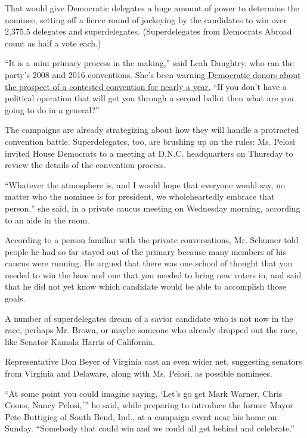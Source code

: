 That would give Democratic delegates a huge amount of power to determine
the nominee, setting off a fierce round of jockeying by the candidates
to win over 2,375.5 delegates and superdelegates. (Superdelegates from
Democrats Abroad count as half a vote each.)

``It is a mini primary process in the making,'' said Leah Daughtry, who
ran the party's 2008 and 2016 conventions. She's been
warnin\href{https://www.nytimes3xbfgragh.onion/2019/04/16/us/politics/bernie-sanders-democratic-party.html}{g
Democratic donors about the prospect of a contested convention for
nearly a year.} ``If you don't have a political operation that will get
you through a second ballot then what are you going to do in a
general?''

The campaigns are already strategizing about how they will handle a
protracted convention battle. Superdelegates, too, are brushing up on
the rules: Ms. Pelosi invited House Democrats to a meeting at D.N.C.
headquarters on Thursday to review the details of the convention
process.

``Whatever the atmosphere is, and I would hope that everyone would say,
no matter who the nominee is for president, we wholeheartedly embrace
that person,'' she said, in a private caucus meeting on Wednesday
morning, according to an aide in the room.

According to a person familiar with the private conversations, Mr.
Schumer told people he had so far stayed out of the primary because many
members of his caucus were running. He argued that there was one school
of thought that you needed to win the base and one that you needed to
bring new voters in, and said that he did not yet know which candidate
would be able to accomplish those goals.

A number of superdelegates dream of a savior candidate who is not now in
the race, perhaps Mr. Brown, or maybe someone who already dropped out
the race, like Senator Kamala Harris of California.

Representative Don Beyer of Virginia cast an even wider net, suggesting
senators from Virginia and Delaware, along with Ms. Pelosi, as possible
nominees.

``At some point you could imagine saying, `Let's go get Mark Warner,
Chris Coons, Nancy Pelosi,''' he said, while preparing to introduce the
former Mayor Pete Buttigieg of South Bend, Ind., at a campaign event
near his home on Sunday. ``Somebody that could win and we could all get
behind and celebrate.''

